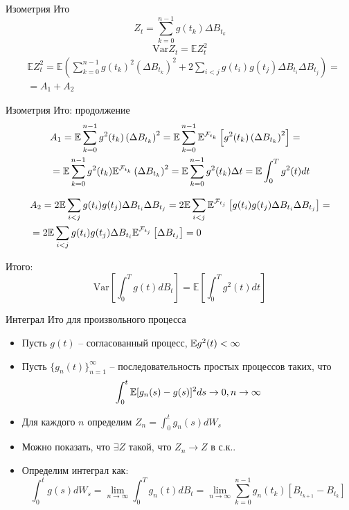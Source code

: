 \documentclass{beamer}
\begin{document}
\begin{frame}{Изометрия Ито}
    $$ Z_t = \sum_{k=0}^{n-1} g(t_k) \Delta B_{t_k}$$
    $$\mathrm{Var} Z_t = \mathbb{E} Z_t^2$$
    \begin{align*}
        &\mathbb{E} Z_t^2 = \mathbb{E} \left(\sum_{k=0}^{n-1} g(t_k)^2 \left(\Delta B_{t_k}\right)^2 + 2 \sum_{i < j} g(t_i)g(t_j) \Delta B_{t_i} \Delta B_{t_j}\right) = \\
        &= A_1 + A_2
    \end{align*}
\end{frame}

\begin{frame}{Изометрия Ито: продолжение}
    \begin{align*}
        &A_1 = \mathbb{E} \sum_{k=0}^{n-1} g^2(t_k) \left(\Delta B_{t_k}\right)^2 = 
        \mathbb{E} \sum_{k=0}^{n-1} \mathbb{E}^{\mathcal{F}_{t_k}} \left[g^2(t_k) \left(\Delta B_{t_k}\right)^2 \right] 
        = \\ 
        & = \mathbb{E} \sum_{k=0}^{n-1} g^2(t_k) \mathbb{E}^{\mathcal{F}_{t_k}} \left(\Delta B_{t_k}\right)^2 = \mathbb{E} \sum_{k=0}^{n-1} g^2(t_k) \Delta t = \mathbb{E} \int_0^T g^2(t) dt 
    \end{align*}
     
    \begin{align*}
        &A_2 = 2 \mathbb{E} \sum_{i < j} g(t_i)g(t_j) \Delta B_{t_i} \Delta B_{t_j} =
        2 \mathbb{E} \sum_{i < j} \mathbb{E}^{\mathcal{F}_{t_j}} \left[g(t_i)g(t_j) \Delta B_{t_i} \Delta B_{t_j}\right] = \\
        &= 2 \mathbb{E} \sum_{i < j} g(t_i)g(t_j) \Delta B_{t_i} \mathbb{E}^{\mathcal{F}_{t_j}} \left[ \Delta B_{t_j}\right] = 0
    \end{align*}
     
    Итого:
    $$ \mathrm{Var} \left[ \int_0^T g(t) dB_t \right] = \mathbb{E} \left[\int_0^T g^2(t) dt\right]$$
\end{frame}


\begin{frame}{Интеграл Ито для произвольного процесса}
    \begin{itemize}
        \item Пусть $g(t)$ -- согласованный процесс, $\mathbb{E} g^2(t) < \infty$
        \item Пусть $\{g_n(t)\}_{n=1}^{\infty}$ -- последовательность простых процессов таких, что 
        $$
            \int_0^t \mathbb{E} [g_n(s)-g(s)]^2 ds \to 0, n \to \infty
        $$
        \item Для каждого $n$ определим $Z_n = \int_0^t g_n(s)dW_s$

        \item Можно показать, что $\exists Z$ такой, что $Z_n \to Z$ в с.к.. 
        
        \item Определим интеграл как:
        $$
            \int_0^t g(s)dW_s =  \lim_{n\to \infty}\int_0^T g_n(t) dB_t = \lim_{n \to \infty} \sum_{k=0}^{n-1} g_n(t_k)\left[B_{t_{k+1}} - B_{t_k}\right]
        $$
    \end{itemize}
\end{frame}
\end{document}
